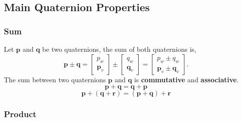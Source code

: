 \documentclass{article}
\renewcommand{\Vec}[1]{{\mathbf{#1}}}
\begin{document}
\subsection{Main Quaternion Properties}


\subsubsection{Sum}

Let $\Vec{p}$ and $\Vec{q}$ be two quaternions, the sum of both quaternions is,
%
\begin{equation}
  \Vec{p} \pm \Vec{q} =
  \begin{bmatrix} p_w \\ \Vec{p}_{v} \end{bmatrix}
  \pm
  \begin{bmatrix} q_w \\ \Vec{q}_{v} \end{bmatrix} =
  \begin{bmatrix} p_w \pm q_w \\ \Vec{p}_{v} \pm \Vec{q}_{v} \end{bmatrix}.
\end{equation}
%
The sum between two quaternions $\Vec{p}$ and $\Vec{q}$ is \textbf{commutative}
and \textbf{associative}.
%
\begin{equation}
  \Vec{p} + \Vec{q} = \Vec{q} + \Vec{p}
\end{equation}
%
\begin{equation}
  \Vec{p} + (\Vec{q} + \Vec{r}) = (\Vec{p} + \Vec{q}) + \Vec{r}
\end{equation}


\subsubsection{Product}
\end{document}
